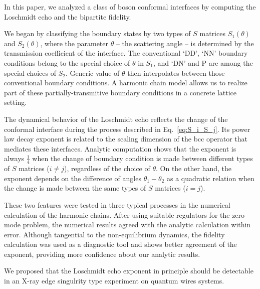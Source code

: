 
In this paper, we analyzed a class of boson conformal interfaces by computing the Loschmidt echo and the bipartite fidelity. 

We began by classifying the boundary states by two types of $S$ matrices $S_1(\theta)$ and $S_2(\theta)$, where the parameter $\theta$ -- the scattering angle -- is determined by the transmission coefficient of the interface. The conventional `DD', `NN' boundary conditions belong to the special choice of $\theta$ in $S_1$, and `DN' and P are among the special choices of $S_2$. Generic value of $\theta$ then interpolates between those conventional boundary conditions. A harmonic chain model allows us to realize part of these partially-transmitive boundary conditions in a concrete lattice setting. 

The dynamical behavior of the Loschmidt echo reflects the change of the conformal interface during the process described in {\color{red}Eq.~\eqref{eq:S_i_S_j}}.
Its power law decay exponent is related to the scaling dimension of the bcc operator that mediates these interfaces. Analytic computation shows that the exponent is always $\frac{1}{4}$ when the change of boundary condition is made between different types of $S$ matrices ($i \ne j$), regardless of the choice of $\theta$. On the other hand, the exponent depends on the difference of angles $\theta_1 - \theta_2$ as a quadratic relation when the change is made between the same types of $S$ matrices ($i = j$).

These two features were tested in three typical processes in the numerical calculation of the harmonic chains. After using suitable regulators for the zero-mode problem, the numerical results agreed with the analytic calculation within error. Although tangential to the non-equilibrium dynamics, the fidelity calculation was used as a diagnostic tool and shows better agreement of the exponent, providing more confidence about our analytic results. 

We proposed that the Loschmidt echo exponent in principle should be detectable in an X-ray edge singulrity type experiment on quantum wires systems. 

